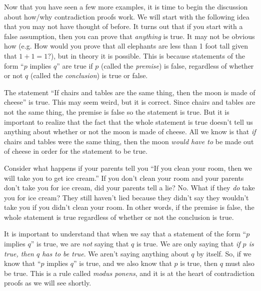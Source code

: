 Now that you have seen a few more examples, it is time to begin the discussion about 
how/why contradiction proofs work. 
We will start with the following idea that you may not have thought of before.
It turns out that if you start with a false assumption, then
you can prove that {\em anything} is true.  
It may not be obvious how 
(e.g. How would you prove that all elephants are less than 1 foot tall given that $1+1=1$?), 
but in theory it is possible.
This is because statements of the form ``$p$ implies $q$'' are true if $p$ (called the {\em premise}) is false, 
regardless of whether or not $q$ (called the {\em conclusion}) is true or false.

\begin{exa}
The statement ``If chairs and tables are the same thing, then the moon is made of cheese''
is true.  This may seem weird, but it is correct.  Since chairs and tables are not the same thing,
the premise is false so the statement is true.  But it is important to realize that the fact
that the whole statement is true doesn't tell us anything about whether or not the moon is made of cheese.
All we know is that {\em if} chairs and tables were the same thing, then the moon {\em would have to} 
be made out of cheese in order for the statement to be true.
\end{exa}

\begin{exa}
Consider what happens 
if your parents tell you ``If you clean your room, then we will take you to get ice cream.''
If you don't clean your room and your parents don't take you for ice cream, 
did your parents tell a lie? No.  What if they {\em do} take you for ice cream?  They still haven't
lied because they didn't say they wouldn't take you if you didn't clean your room.
In other words, if the premise is false, the whole statement is true regardless of whether or not
the conclusion is true.
\end{exa}

It is important to understand that when we say that a statement of the form ``$p$ implies $q$'' is true, 
we are {\em not} saying that $q$ is true.  We are only saying that {\em if $p$ is true, then $q$ has to be true}.  
We aren't saying anything about $q$ by itself.  
So, if we know that ``$p$ implies $q$'' is true, and we also know that $p$ is true, then $q$ must also
be true.  This is a rule called {\em modus ponens},
and it is at the heart of contradiction proofs as we will see shortly.

